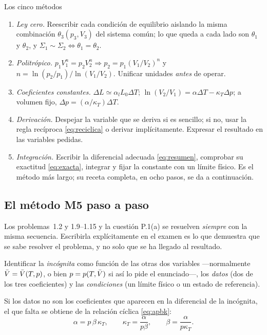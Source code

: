 \begin{recuadro}{Los cinco métodos}
\begin{enumerate}[label=\textbf{\color{navy}M\arabic*.},leftmargin=2.2em,itemsep=4pt]
\item \emph{Ley cero.} Reescribir cada condición de equilibrio aislando la misma combinación
  $\theta_3(p_3,V_3)$ del sistema común; lo que queda a cada lado son $\theta_1$ y $\theta_2$, y
  $\Sigma_1\sim\Sigma_2\iff\theta_1=\theta_2$.
\item \emph{Politrópico.} $p_1V_1^n=p_2V_2^n\Rightarrow p_2=p_1(V_1/V_2)^n$ y
  $n=\ln(p_2/p_1)/\ln(V_1/V_2)$. Unificar unidades \emph{antes} de operar.
\item \emph{Coeficientes constantes.} $\Delta L\simeq\alpha_lL_0\Delta T$;
  $\ln(V_2/V_1)=\alpha\Delta T-\kappa_T\Delta p$; a volumen fijo, $\Delta p=(\alpha/\kappa_T)\Delta T$.
\item \emph{Derivación.} Despejar la variable que se deriva si es sencillo; si no, usar la regla
  recíproca \eqref{eq:reciclica} o derivar implícitamente. Expresar el resultado en las variables pedidas.
\item \emph{Integración.} Escribir la diferencial adecuada \eqref{eq:resumen}, comprobar su exactitud
  \eqref{eq:exacta}, integrar y fijar la constante con un límite físico. Es el método más largo; su
  receta completa, en ocho pasos, se da a continuación.
\end{enumerate}
\end{recuadro}

\subsection{El método M5 paso a paso}\label{sec:receta}

Los problemas~1.2 y 1.9--1.15 y la cuestión P.1(a) se resuelven \emph{siempre} con la misma secuencia.
Escribirla explícitamente en el examen es lo que demuestra que se sabe resolver el problema, y no
solo que se ha llegado al resultado.

 Identificar la \emph{incógnita} como función de las otras dos variables
---normalmente $\bar{V}=\bar{V}(T,p)$, o bien $p=p(T,\bar{V})$ si así lo pide el enunciado---, los \emph{datos}
(dos de los tres coeficientes) y las \emph{condiciones} (un límite físico o un estado de referencia).

 Si los datos no son los coeficientes que aparecen en la
diferencial de la incógnita, el que falta se obtiene de la relación cíclica \eqref{eq:apbk}:
\[
  \alpha=p\,\beta\,\kappa_T,\qquad \kappa_T=\frac{\alpha}{p\beta},\qquad \beta=\frac{\alpha}{p\kappa_T}.
\]


